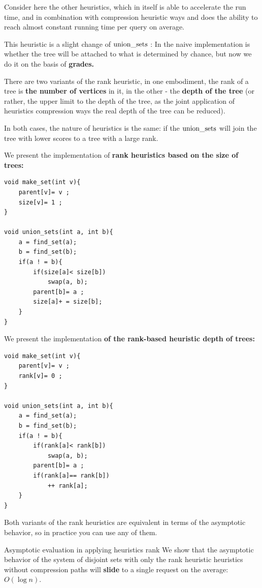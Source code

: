 Consider here the other heuristics, which in itself is able to accelerate the run time, and in combination with compression heuristic ways and does the ability to reach almost constant running time per query on average.

This heuristic is a slight change of ${\rm union \_sets}$ : In the naive implementation is whether the tree will be attached to what is determined by chance, but now we do it on the basis of \textbf{grades.}

There are two variants of the rank heuristic, in one embodiment, the rank of a tree is \textbf{the number of vertices} in it, in the other - the \textbf{depth of the tree} (or rather, the upper limit to the depth of the tree, as the joint application of heuristics compression ways the real depth of the tree can be reduced).

In both cases, the nature of heuristics is the same: if the $\rm union \_sets$ will join the tree with lower scores to a tree with a large rank.

We present the implementation of \textbf{rank heuristics based on the size of trees:}

\begin{verbatim}
void make_set(int v){
    parent[v]= v ;
    size[v]= 1 ;
}
 
void union_sets(int a, int b){
    a = find_set(a);
    b = find_set(b);
    if(a ! = b){
        if(size[a]< size[b])
            swap(a, b);
        parent[b]= a ;
        size[a]+ = size[b];
    }
} 
\end{verbatim}
We present the implementation \textbf{of the rank-based heuristic depth of trees:}

\begin{verbatim}
void make_set(int v){
    parent[v]= v ;
    rank[v]= 0 ;
}
 
void union_sets(int a, int b){
    a = find_set(a);
    b = find_set(b);
    if(a ! = b){
        if(rank[a]< rank[b])
            swap(a, b);
        parent[b]= a ;
        if(rank[a]== rank[b])
            ++ rank[a];
    }
} 
\end{verbatim}
Both variants of the rank heuristics are equivalent in terms of the asymptotic behavior, so in practice you can use any of them.

Asymptotic evaluation in applying heuristics rank
We show that the asymptotic behavior of the system of disjoint sets with only the rank heuristic heuristics without compression paths will \textbf{slide} to a single request on the average: $O (\log n)$.

